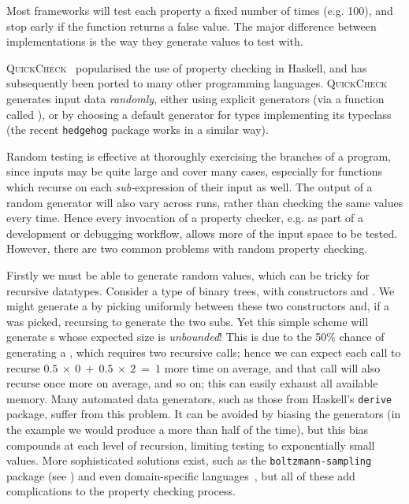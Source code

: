 Most frameworks will test each property a fixed number of times (e.g. 100), and
stop early if the function returns a false value. The major difference between
implementations is the way they generate values to test with.

\textsc{QuickCheck}~\cite{claessen2011quickcheck} popularised the use of
property checking in Haskell, and has subsequently been ported to many other
programming languages. \textsc{QuickCheck} generates input data \emph{randomly},
either using explicit generators (via a function called ), or by
choosing a default generator for types implementing its 
typeclass (the recent \texttt{hedgehog} package works in a similar way\iffalse
\cite{TODO} \fi).

Random testing is effective at thoroughly exercising the branches of a program,
since inputs may be quite large and cover many cases, especially for functions
which recurse on each \emph{sub-}expression of their input as well. The output
of a random generator will also vary across runs, rather than checking the same
values every time. Hence every invocation of a property checker, e.g. as part of
a development or debugging workflow, allows more of the input space to be
tested. However, there are two common problems with random property checking.

Firstly we must be able to generate random values, which can be tricky for
recursive datatypes. Consider a type of binary trees, with constructors
 and . We might
generate a  by picking uniformly between these two constructors
and, if a  was picked, recursing to generate the two
subs. Yet this simple scheme will generate s whose
expected size is \emph{unbounded}! This is due to the 50\% chance of generating
a , which requires two recursive calls; hence we can expect each
call to recurse $0.5~\times~0~+~0.5~\times~2~=~1$ more time on average, and that call will also
recurse once more on average, and so on; this can easily exhaust all available
memory. Many automated data generators, such as those from Haskell's
\texttt{derive} package, suffer from this problem. It can be avoided by biasing
the generators (in the  example we would produce a 
more than half of the time), but this bias compounds at each level of recursion,
limiting testing to exponentially small values. More sophisticated solutions
exist, such as the \texttt{boltzmann-sampling} package (see
\cite{duchon2004boltzmann}) and even domain-specific
languages~\cite{lampropoulos2017beginner}, but all of these add complications to
the property checking process.

